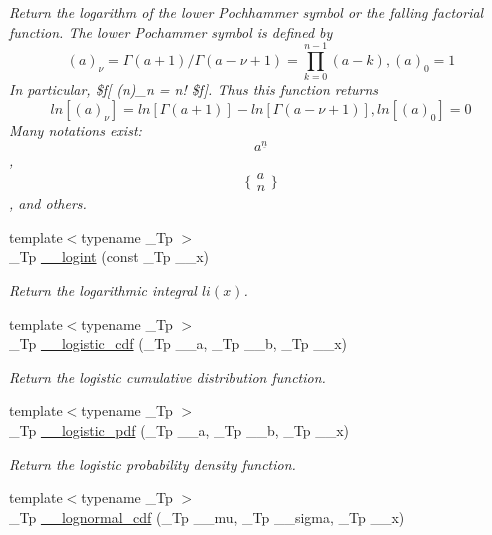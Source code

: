 \begin{DoxyCompactItemize}
\begin{DoxyCompactList}\small\item\em Return the logarithm of the lower Pochhammer symbol or the falling factorial function. The lower Pochammer symbol is defined by \[ (a)_\nu = \Gamma(a + 1) / \Gamma(a - \nu + 1) = \prod_{k=0}^{n-1} (a - k), (a)_0 = 1 \] In particular, \$f\mbox{[} (n)\+\_\+n = n! \$f\mbox{]}. Thus this function returns \[ ln[(a)_\nu] = ln[\Gamma(a + 1)] - ln[\Gamma(a - \nu + 1)], ln[(a)_0] = 0 \] Many notations exist\+: \[ a^{\underline{n}} \], \[ \{ \begin{array}{c} a \\ n \end{array} \} \], and others. \end{DoxyCompactList}\item 
{\footnotesize template$<$typename \+\_\+\+Tp $>$ }\\\+\_\+\+Tp \hyperlink{namespacestd_1_1____detail_a4d5f8cb2b4e6e192faba9418ec14149f}{\+\_\+\+\_\+logint} (const \+\_\+\+Tp \+\_\+\+\_\+x)
\begin{DoxyCompactList}\small\item\em Return the logarithmic integral $ li(x) $. \end{DoxyCompactList}\item 
{\footnotesize template$<$typename \+\_\+\+Tp $>$ }\\\+\_\+\+Tp \hyperlink{namespacestd_1_1____detail_abe893340d3de850ff3c9701deb914f96}{\+\_\+\+\_\+logistic\+\_\+cdf} (\+\_\+\+Tp \+\_\+\+\_\+a, \+\_\+\+Tp \+\_\+\+\_\+b, \+\_\+\+Tp \+\_\+\+\_\+x)
\begin{DoxyCompactList}\small\item\em Return the logistic cumulative distribution function. \end{DoxyCompactList}\item 
{\footnotesize template$<$typename \+\_\+\+Tp $>$ }\\\+\_\+\+Tp \hyperlink{namespacestd_1_1____detail_a4c845b9f17fc3e35dccc0954d82d62f9}{\+\_\+\+\_\+logistic\+\_\+pdf} (\+\_\+\+Tp \+\_\+\+\_\+a, \+\_\+\+Tp \+\_\+\+\_\+b, \+\_\+\+Tp \+\_\+\+\_\+x)
\begin{DoxyCompactList}\small\item\em Return the logistic probability density function. \end{DoxyCompactList}\item 
{\footnotesize template$<$typename \+\_\+\+Tp $>$ }\\\+\_\+\+Tp \hyperlink{namespacestd_1_1____detail_a871cf2e541cc4f8a79e4d219c628edc4}{\+\_\+\+\_\+lognormal\+\_\+cdf} (\+\_\+\+Tp \+\_\+\+\_\+mu, \+\_\+\+Tp \+\_\+\+\_\+sigma, \+\_\+\+Tp \+\_\+\+\_\+x)

\end{DoxyCompactItemize}
